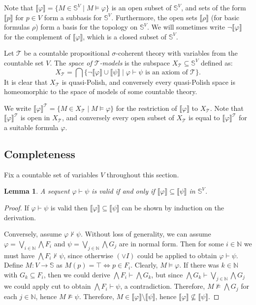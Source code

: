 \documentclass{article}
\theoremstyle{plain}
\newtheorem{lemma}[Theorem]{Lemma}
\def\cal#1{{\mathcal #1}}
\def\IN{{\mathbb N}}
\def\sierp{{\mathbb S}}
\def\calT{{\cal T}}
\begin{document}
Note that $\llbracket \varphi \rrbracket = \{ M\in\sierp^V\mid M\vDash \varphi\}$ is an open subset of $\sierp^V$, and sets of the form $\llbracket p \rrbracket$ for $p\in V$ form a subbasis for $\sierp^V$. Furthermore, the open sets $\llbracket\rho\rrbracket$ (for basic formulas $\rho$) form a basis for the topology on $\sierp^V$. We will sometimes write $\neg\llbracket\varphi\rrbracket$ for the complement of $\llbracket\varphi\rrbracket$, which is a closed subset of $\sierp^V$.

Let $\calT$ be a countable propositional $\sigma$-coherent theory with variables from the countable set $V$. The \emph{space of $\calT$-models} is the subspace $X_\calT \subseteq \sierp^V$ defined as:
\[ X_\calT=\bigcap\{ \neg\llbracket\varphi\rrbracket\cup\llbracket\psi\rrbracket \mid \varphi\vdash \psi\text{ is an axiom of } \calT\}.\]
It is clear that $X_\calT$ is quasi-Polish, and conversely every quasi-Polish space is homeomorphic to the space of models of some countable theory.

We write $\llbracket \varphi \rrbracket^{\calT} = \{ M\in X_\calT\mid M\vDash \varphi\}$ for the restriction of $\llbracket \varphi \rrbracket$ to $X_\calT$. Note that $\llbracket \varphi \rrbracket^{\calT}$ is open in $X_\calT$, and conversely every open subset of $X_\calT$ is equal to $\llbracket \varphi \rrbracket^{\calT}$ for a suitable formula $\varphi$.

\subsection{Completeness}

Fix a countable set of variables $V$ throughout this section.

\begin{lemma}\label{lem:axiomless_proofs}
A sequent $\varphi \vdash \psi$ is valid if and only if $\llbracket \varphi \rrbracket \subseteq \llbracket \psi \rrbracket$ in $\sierp^V$.
\end{lemma}
\begin{proof}
If $\varphi \vdash \psi$ is valid then $\llbracket \varphi \rrbracket\subseteq \llbracket\psi\rrbracket$ can be shown by induction on the derivation.

Conversely, assume $\varphi \not\vdash\psi$. Without loss of generality, we can assume $\varphi = \bigvee_{i\in \IN}\bigwedge F_i$ and $\psi = \bigvee_{j\in \IN}\bigwedge G_j$ are in normal form. Then for some $i\in\IN$ we must have $\bigwedge F_i \not\vdash \psi$, since otherwise $(\vee I)$ could be applied to obtain $\varphi\vdash \psi$. Define $M\colon V\to \sierp$ as $M(p)=\top \iff p\in F_i$. Clearly, $M\vDash \varphi$. If there was $k\in\IN$ with $G_k \subseteq F_i$, then we could derive $\bigwedge F_i \vdash \bigwedge G_k$, but since $\bigwedge G_k \vdash \bigvee_{j\in \IN}\bigwedge G_j$ we could apply cut to obtain $\bigwedge F_i \vdash \psi$, a contradiction. Therefore, $M\not\vDash \bigwedge G_j$ for each $j\in\IN$, hence $M\not\vDash \psi$. Therefore, $M\in\llbracket\varphi\rrbracket \setminus \llbracket\psi\rrbracket$, hence $\llbracket\varphi\rrbracket\not\subseteq\llbracket\psi\rrbracket$.
\end{proof}
\end{document}

